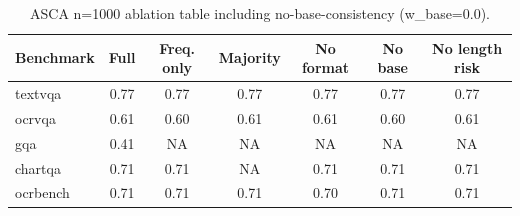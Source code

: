 \begin{table}[t]
\centering
\small
\begin{tabular}{lcccccc}
\toprule
Benchmark & Full & Freq. only & Majority & No format & No base & No length risk \\
\midrule
textvqa & 0.77 & 0.77 & 0.77 & 0.77 & 0.77 & 0.77 \\
ocrvqa & 0.61 & 0.60 & 0.61 & 0.61 & 0.60 & 0.61 \\
gqa & 0.41 & NA & NA & NA & NA & NA \\
chartqa & 0.71 & 0.71 & NA & 0.71 & 0.71 & 0.71 \\
ocrbench & 0.71 & 0.71 & 0.71 & 0.70 & 0.71 & 0.71 \\
\bottomrule
\end{tabular}
\caption{ASCA n=1000 ablation table including no-base-consistency (w_base=0.0).}
\label{tab:ablation_n1000_complete}
\end{table}
